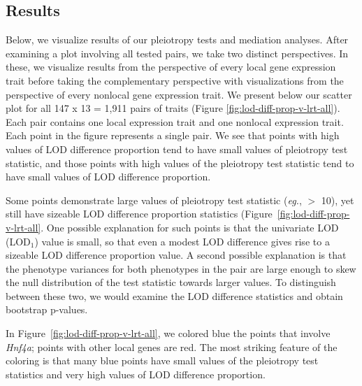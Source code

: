 \documentclass[oneside]{book}\usepackage[]{graphicx}\usepackage[]{color}
\begin{document}
\subsection{Results}

Below, we visualize results of our pleiotropy tests and mediation analyses. 
After examining a plot involving all tested pairs, we take two distinct perspectives. 
In these, we visualize results from the perspective of every local gene expression trait 
before taking the complementary perspective with visualizations from the 
perspective of every nonlocal gene expression trait.
We present below our scatter plot for all 147 x 13 = 1,911 
pairs of traits (Figure \ref{fig:lod-diff-prop-v-lrt-all}). 
Each pair contains one local expression trait and one nonlocal expression trait. 
Each point in the figure represents a single pair. 
We see that points with high values of LOD difference proportion tend to have small 
values of pleiotropy test statistic, and those points with high values of the 
pleiotropy test statistic tend to have small values of LOD difference proportion. 

Some points demonstrate large values of pleiotropy test statistic (\emph{eg.}, $>$ 10), 
yet still have sizeable LOD difference proportion statistics (Figure~\ref{fig:lod-diff-prop-v-lrt-all}. 
One possible explanation for such points is that the univariate LOD (LOD$_1$) value is small, 
so that even a modest LOD difference gives rise to a sizeable LOD difference proportion value. 
A second possible explanation is that the phenotype variances for both phenotypes in the pair 
are large enough to skew the null distribution of the test statistic towards larger values. 
To distinguish between these two, we would 
examine the LOD difference statistics and obtain bootstrap p-values.

In Figure~\ref{fig:lod-diff-prop-v-lrt-all}, we colored blue the points that involve \emph{Hnf4a}; 
points with other local genes are red. 
The most striking feature of the coloring is that many blue points have small 
values of the pleiotropy test statistics and very high values of LOD difference proportion.
\end{document}
